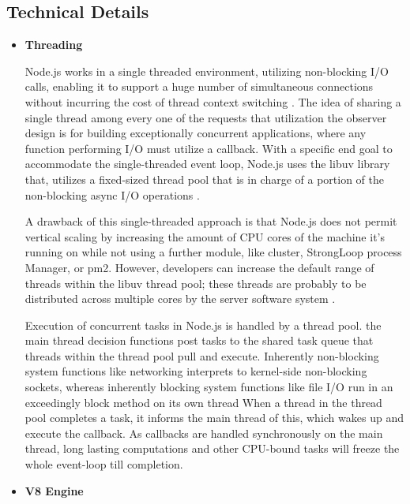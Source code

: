 \documentclass[../thesis.tex]{subfiles}
\begin{document}
\subsection*{Technical Details}
\begin{itemize}
    \item \textbf{Threading}
    \newline
    
    Node.js works in a single threaded environment, utilizing non-blocking I/O calls, enabling it to support a huge number of simultaneous connections without incurring the cost of thread context switching \cite{13}. The idea of sharing a single thread among every one of the requests that utilization the observer design is for building exceptionally concurrent applications, where any function performing I/O must utilize a callback. With a specific end goal to accommodate the single-threaded event loop, Node.js uses the libuv library that, utilizes a fixed-sized thread pool that is in charge of a portion of the non-blocking async I/O operations \cite{14}.
    \newline
    
    A drawback of this single-threaded approach is that Node.js does not permit vertical scaling by increasing the amount of CPU cores of the machine it's running on while not using a further module, like cluster, StrongLoop process Manager, or pm2. However, developers can increase the default range of threads within the libuv thread pool; these threads are probably to be distributed across multiple cores by the server software system \cite{15}.
    \newline
    
    Execution of concurrent tasks in Node.js is handled by a thread pool. the main thread decision functions post tasks to the shared task queue that threads within the thread pool pull and execute. Inherently non-blocking system functions like networking interprets to kernel-side non-blocking sockets, whereas inherently blocking system functions like file I/O run in an exceedingly block method on its own thread When a thread in the thread pool completes a task, it informs the main thread of this, which wakes up and execute the callback. As callbacks are handled synchronously on the main thread, long lasting computations and other CPU-bound tasks will freeze the whole event-loop till completion.
    \newline
    
    \item \textbf{V8 Engine}
    \newline
    

\end{itemize}
\end{document}
